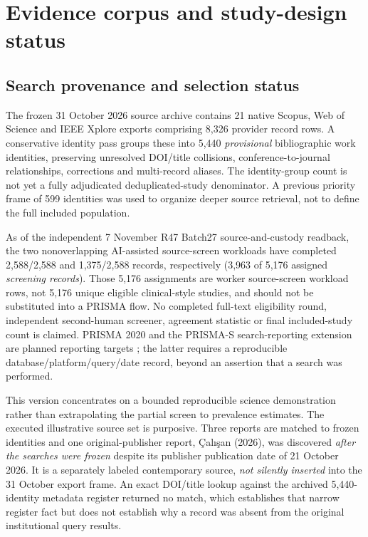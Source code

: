 \documentclass[10pt,a4paper]{article}
\begin{document}
\section{Evidence corpus and study-design status}
\subsection{Search provenance and selection status}
The frozen 31 October 2026 source archive contains 21 native Scopus, Web of Science and IEEE Xplore exports comprising 8,326 provider record rows. A conservative identity pass groups these into 5,440 \emph{provisional} bibliographic work identities, preserving unresolved DOI/title collisions, conference-to-journal relationships, corrections and multi-record aliases. The identity-group count is not yet a fully adjudicated deduplicated-study denominator. A previous priority frame of 599 identities was used to organize deeper source retrieval, not to define the full included population.

As of the independent 7 November R47 Batch27 source-and-custody readback, the two nonoverlapping AI-assisted source-screen workloads have completed 2,588/2,588 and 1,375/2,588 records, respectively (3,963 of 5,176 assigned \emph{screening records}). Those 5,176 assignments are worker source-screen workload rows, not 5,176 unique eligible clinical-style studies, and should not be substituted into a PRISMA flow. No completed full-text eligibility round, independent second-human screener, agreement statistic or final included-study count is claimed. PRISMA 2020 and the PRISMA-S search-reporting extension are planned reporting targets \cite{prisma,prismas}; the latter requires a reproducible database/platform/query/date record, beyond an assertion that a search was performed.

This version concentrates on a bounded reproducible science demonstration rather than extrapolating the partial screen to prevalence estimates. The executed illustrative source set is purposive. Three reports are matched to frozen identities and one original-publisher report, \c{C}al{\i}\c{s}an (2026), was discovered \emph{after the searches were frozen} despite its publisher publication date of 21 October 2026. It is a separately labeled contemporary source, \emph{not silently inserted} into the 31 October export frame. An exact DOI/title lookup against the archived 5,440-identity metadata register returned no match, which establishes that narrow register fact but does not establish why a record was absent from the original institutional query results.
\end{document}
